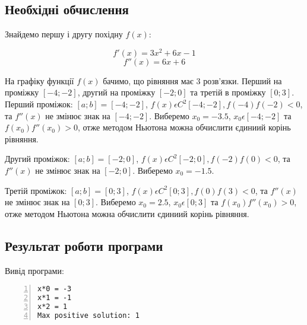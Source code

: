 \documentclass[a4paper, 12pt]{article}
\begin{document}

\subsection{Необхідні обчислення}

Знайдемо першу і другу похідну $f(x)$:

\[ f'(x) = 3x^2 + 6x - 1 \]
\[ f''(x) = 6x + 6 \]

На графіку функції $f(x)$ бачимо, що рівняння має 3 розв'язки. Перший на проміжку $\left[-4; -2\right]$, другий на проміжку $\left[-2; 0\right]$ та третій в проміжку $\left[0; 3\right]$.\\

Перший проміжок: $\left[a; b\right] = \left[-4; -2\right]$, $f(x) \epsilon C^2\left[-4; -2\right], f(-4)f(-2) < 0$, та $f''(x)$ не змінює знак на $\left[-4; -2\right]$. Виберемо $ x_0 = -3.5$, $x_0 \epsilon \left[-4; -2\right]$ та $f(x_0)f''(x_0) > 0$, отже методом Ньютона можна обчислити єдиниий корінь рівняння.

Другий проміжок: $\left[a; b\right] = \left[-2; 0\right]$, $f(x) \epsilon C^2\left[-2; 0\right], f(-2)f(0) < 0$, та $f''(x)$ не змінює знак на $\left[-2; 0\right]$. Виберемо $ x_0 = -1.5$.

Третій проміжок: $\left[a; b\right] = \left[0; 3\right]$, $f(x) \epsilon C^2\left[0; 3\right], f(0)f(3) < 0$, та $f''(x)$ не змінює знак на $\left[0; 3\right]$. Виберемо $ x_0 = 2.5$, $x_0 \epsilon \left[0; 3\right]$ та $f(x_0)f''(x_0) > 0$, отже методом Ньютона можна обчислити єдиниий корінь рівняння.

\subsection{Результат роботи програми}

Вивід програми:

\begin{Verbatim}[numbers=left,xleftmargin=20mm]
x*0 = -3
x*1 = -1
x*2 = 1
Max positive solution: 1
\end{Verbatim}
\end{document}
